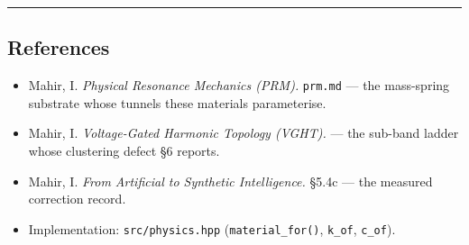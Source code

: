 \documentclass[
  11pt,
  a4paper,
]{article}
\providecommand{\tightlist}{%
  \setlength{\itemsep}{0pt}\setlength{\parskip}{0pt}}
\begin{document}
\begin{center}\rule{0.5\linewidth}{0.5pt}\end{center}

\subsection{References}\label{references}

\begin{itemize}
\tightlist
\item
  Mahir, I. \emph{Physical Resonance Mechanics (PRM).} \texttt{prm.md}
  --- the mass-spring substrate whose tunnels these materials
  parameterise.
\item
  Mahir, I. \emph{Voltage-Gated Harmonic Topology (VGHT).} --- the
  sub-band ladder whose clustering defect §6 reports.
\item
  Mahir, I. \emph{From Artificial to Synthetic Intelligence.} §5.4c ---
  the measured correction record.
\item
  Implementation: \texttt{src/physics.hpp} (\texttt{material\_for()},
  \texttt{k\_of}, \texttt{c\_of}).
\end{itemize}
\end{document}
